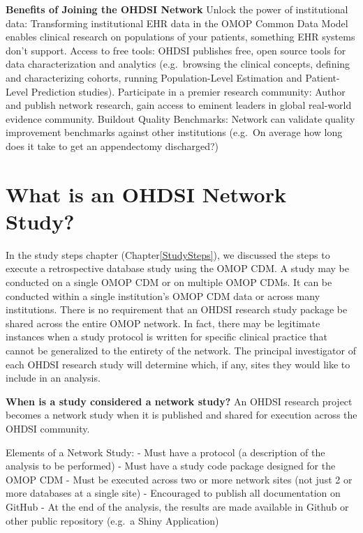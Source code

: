 \documentclass[11pt]{book}
\theoremstyle{definition}
\theoremstyle{definition}
\theoremstyle{definition}
\theoremstyle{remark}
\let\BeginKnitrBlock\begin \let\EndKnitrBlock\end
\begin{document}
\BeginKnitrBlock{rmdimportant}
\textbf{Benefits of Joining the OHDSI Network}
Unlock the power of institutional data: Transforming institutional EHR data in the OMOP Common Data Model enables clinical research on populations of your patients, something EHR systems don't support.
Access to free tools: OHDSI publishes free, open source tools for data characterization and analytics (e.g.~browsing the clinical concepts, defining and characterizing cohorts, running Population-Level Estimation and Patient-Level Prediction studies).
Participate in a premier research community: Author and publish network research, gain access to eminent leaders in global real-world evidence community.
Buildout Quality Benchmarks: Network can validate quality improvement benchmarks against other institutions (e.g.~On average how long does it take to get an appendectomy discharged?)
\EndKnitrBlock{rmdimportant}

\hypertarget{what-is-an-ohdsi-network-study}{%
\section{What is an OHDSI Network Study?}\label{what-is-an-ohdsi-network-study}}

In the study steps chapter (Chapter\ref{StudySteps}), we discussed the steps to execute a retrospective database study using the OMOP CDM. A study may be conducted on a single OMOP CDM or on multiple OMOP CDMs. It can be conducted within a single institution's OMOP CDM data or across many institutions. There is no requirement that an OHDSI research study package be shared across the entire OMOP network. In fact, there may be legitimate instances when a study protocol is written for specific clinical practice that cannot be generalized to the entirety of the network. The principal investigator of each OHDSI research study will determine which, if any, sites they would like to include in an analysis.

\BeginKnitrBlock{rmdimportant}
\textbf{When is a study considered a network study?} An OHDSI research project becomes a network study when it is published and shared for execution across the OHDSI community.

Elements of a Network Study:
- Must have a protocol (a description of the analysis to be performed)
- Must have a study code package designed for the OMOP CDM
- Must be executed across two or more network sites (not just 2 or more databases at a single site)
- Encouraged to publish all documentation on GitHub
- At the end of the analysis, the results are made available in Github or other public repository (e.g.~a Shiny Application)
\EndKnitrBlock{rmdimportant}
\end{document}
